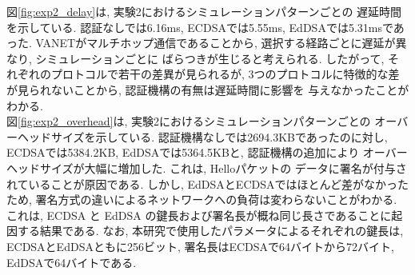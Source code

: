 \FloatBarrier
\indent 図\ref{fig:exp2_delay}は, 実験2におけるシミュレーションパターンごとの
遅延時間を示している. 認証なしでは6.16ms, ECDSAでは5.55ms, EdDSAでは5.31msであった. 
VANETがマルチホップ通信であることから, 選択する経路ごとに遅延が異なり, シミュレーションごとに
ばらつきが生じると考えられる. したがって, それぞれのプロトコルで若干の差異が見られるが, 
3つのプロトコルに特徴的な差が見られないことから, 認証機構の有無は遅延時間に影響を
与えなかったことがわかる. \\
\indent 図\ref{fig:exp2_overhead}は, 実験2におけるシミュレーションパターンごとの
オーバーヘッドサイズを示している. 認証機構なしでは2694.3KBであったのに対し, 
ECDSAでは5384.2KB, EdDSAでは5364.5KBと, 認証機構の追加により
オーバーヘッドサイズが大幅に増加した. これは, Helloパケットの
データに署名が付与されていることが原因である. しかし, EdDSAとECDSAではほとんど差がなかったため, 
署名方式の違いによるネットワークへの負荷は変わらないことがわかる. 
これは, ECDSA と EdDSA の鍵長および署名長が概ね同じ長さであることに起因する結果である. 
なお, 本研究で使用したパラメータによるそれぞれの鍵長は, 
ECDSAとEdDSAともに256ビット, 署名長はECDSAで64バイトから72バイト, EdDSAで64バイトである. \\


